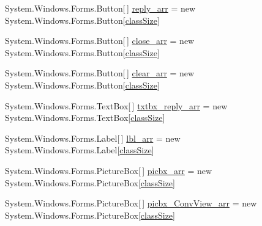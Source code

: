 \begin{DoxyCompactItemize}
\item 
\-System.\-Windows.\-Forms.\-Button\mbox{[}$\,$\mbox{]} \hyperlink{class_sr_p___classroom_inq_1_1frm_classrrom_inq_a46ee30d934a5219840e4381a66728f0f}{reply\-\_\-arr} = new \-System.\-Windows.\-Forms.\-Button\mbox{[}\hyperlink{class_sr_p___classroom_inq_1_1frm_classrrom_inq_a78d9aab335edfe53d39036b9d89928a8}{class\-Size}\mbox{]}
\item 
\-System.\-Windows.\-Forms.\-Button\mbox{[}$\,$\mbox{]} \hyperlink{class_sr_p___classroom_inq_1_1frm_classrrom_inq_a4758f35d344b79b972e88a42cb660904}{close\-\_\-arr} = new \-System.\-Windows.\-Forms.\-Button\mbox{[}\hyperlink{class_sr_p___classroom_inq_1_1frm_classrrom_inq_a78d9aab335edfe53d39036b9d89928a8}{class\-Size}\mbox{]}
\item 
\-System.\-Windows.\-Forms.\-Button\mbox{[}$\,$\mbox{]} \hyperlink{class_sr_p___classroom_inq_1_1frm_classrrom_inq_a1c427c3d5bb61c96ca798e5f6aaff8f4}{clear\-\_\-arr} = new \-System.\-Windows.\-Forms.\-Button\mbox{[}\hyperlink{class_sr_p___classroom_inq_1_1frm_classrrom_inq_a78d9aab335edfe53d39036b9d89928a8}{class\-Size}\mbox{]}
\item 
\-System.\-Windows.\-Forms.\-Text\-Box\mbox{[}$\,$\mbox{]} \hyperlink{class_sr_p___classroom_inq_1_1frm_classrrom_inq_a3411157caafbe33c31a364fafd548afb}{txtbx\-\_\-reply\-\_\-arr} = new \-System.\-Windows.\-Forms.\-Text\-Box\mbox{[}\hyperlink{class_sr_p___classroom_inq_1_1frm_classrrom_inq_a78d9aab335edfe53d39036b9d89928a8}{class\-Size}\mbox{]}
\item 
\-System.\-Windows.\-Forms.\-Label\mbox{[}$\,$\mbox{]} \hyperlink{class_sr_p___classroom_inq_1_1frm_classrrom_inq_a7f0a5f5fff7a87e841b2793f89dcd997}{lbl\-\_\-arr} = new \-System.\-Windows.\-Forms.\-Label\mbox{[}\hyperlink{class_sr_p___classroom_inq_1_1frm_classrrom_inq_a78d9aab335edfe53d39036b9d89928a8}{class\-Size}\mbox{]}
\item 
\-System.\-Windows.\-Forms.\-Picture\-Box\mbox{[}$\,$\mbox{]} \hyperlink{class_sr_p___classroom_inq_1_1frm_classrrom_inq_a067a85853fc3e38cf6343917c4fb061a}{picbx\-\_\-arr} = new \-System.\-Windows.\-Forms.\-Picture\-Box\mbox{[}\hyperlink{class_sr_p___classroom_inq_1_1frm_classrrom_inq_a78d9aab335edfe53d39036b9d89928a8}{class\-Size}\mbox{]}
\item 
\-System.\-Windows.\-Forms.\-Picture\-Box\mbox{[}$\,$\mbox{]} \hyperlink{class_sr_p___classroom_inq_1_1frm_classrrom_inq_a4d179283a68569b1220534d91ddcf6d1}{picbx\-\_\-\-Conv\-View\-\_\-arr} = new \-System.\-Windows.\-Forms.\-Picture\-Box\mbox{[}\hyperlink{class_sr_p___classroom_inq_1_1frm_classrrom_inq_a78d9aab335edfe53d39036b9d89928a8}{class\-Size}\mbox{]}

\end{DoxyCompactItemize}
